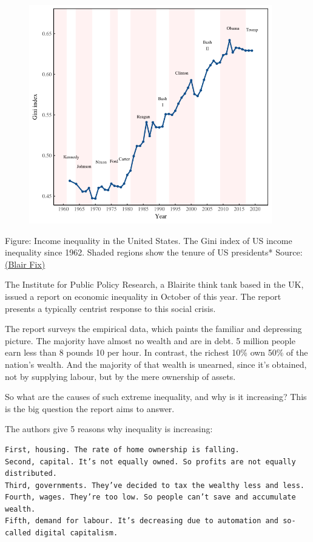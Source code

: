 \documentclass[
]{book}
\begin{document}
\includegraphics[width=5in,height=3.75in]{fig/fix_gini_us.png}

Figure: Income inequality in the United States.
The Gini index of US income inequality since 1962.
Shaded regions show the tenure of US presidents*
Source:\href{https://economicsfromthetopdown.com/2021/02/26/radically-progressive-degrowth-reducing-resource-use-by-eliminating-inequality/}{(Blair Fix)}

The Institute for Public Policy Research, a Blairite think tank based in the UK, issued a report on economic inequality in October of this year. The report presents a typically centrist response to this social crisis.

The report surveys the empirical data, which paints the familiar and depressing picture. The majority have almost no wealth and are in debt. 5 million people earn less than 8 pounds 10 per hour. In contrast, the richest 10\% own 50\% of the nation's wealth. And the majority of that wealth is unearned, since it's obtained, not by supplying labour, but by the mere ownership of assets.

So what are the causes of such extreme inequality, and why is it increasing? This is the big question the report aims to answer.

The authors give 5 reasons why inequality is increasing:

\begin{verbatim}
First, housing. The rate of home ownership is falling.
Second, capital. It’s not equally owned. So profits are not equally distributed.
Third, governments. They’ve decided to tax the wealthy less and less.
Fourth, wages. They’re too low. So people can’t save and accumulate wealth.
Fifth, demand for labour. It’s decreasing due to automation and so-called digital capitalism.
\end{verbatim}
\end{document}
